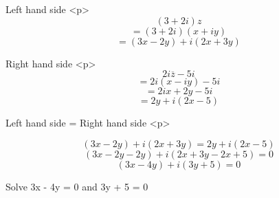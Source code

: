 Left hand side
<p>
$$(3+2i)z$$
$$= (3+2i)(x + iy)$$
$$= (3x-2y)+i(2x+3y)$$

Right hand side
<p>
$$2i\overline{z}-5i$$
$$= 2i(x-iy)-5i$$
$$= 2ix+2y-5i$$
$$= 2y + i(2x-5)$$

Left hand side = Right hand side
<p>

$$(3x-2y)+i(2x+3y) = 2y + i(2x-5)$$
$$(3x-2y-2y)+i(2x+3y-2x+5) = 0$$
$$(3x-4y)+i(3y+5) = 0$$

Solve 3x - 4y = 0 and 3y + 5 = 0


